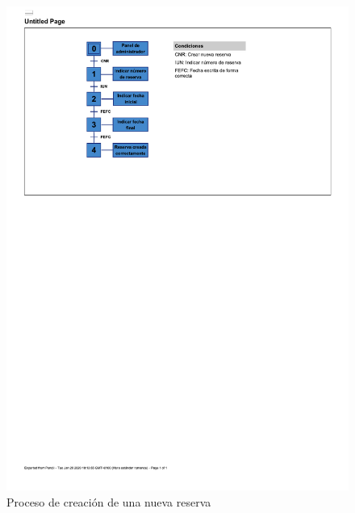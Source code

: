 \begin{figure}[tbp]
\centering
\includegraphics[scale=1]{fig/Grafcet_creacion_nueva_reserva.pdf}
\caption{Proceso de creación de una nueva reserva}
\label{fig:proceso-nueva-reserva}
\end{figure}

